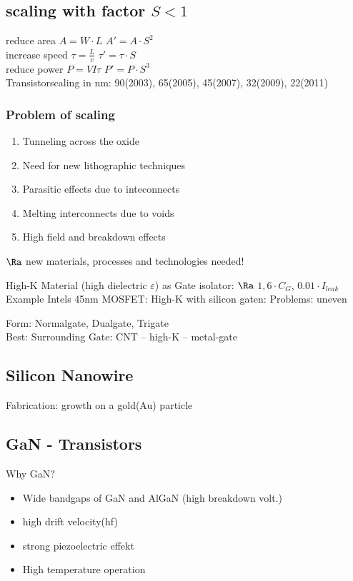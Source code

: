 \documentclass[fs, footer]{latex4ei}
\begin{document}
\begin{multicols}{4}
	
	\subsection{scaling with factor $S < 1$}
	
	reduce area $A = W \cdot L$ \quad $A' = A \cdot S^2$\\
	increase speed $\tau = \frac{L}{v}$ \quad $\tau' = \tau \cdot S$\\
	reduce power $P = VI\tau$ \quad $P' = P \cdot S^3$\\
	
	
	Transistorscaling in nm: 90(2003), 65(2005), 45(2007), 32(2009), 22(2011) 
	
		
		\subsubsection{Problem of scaling}
		\begin{enumerate}
			\item Tunneling across the oxide
			\item Need for new lithographic techniques
			\item Parasitic effects due to inteconnects
			\item Melting interconnects due to voids
			\item High field and breakdown effects
		\end{enumerate}
		$\Ra$ new materials, processes and technologies needed!

		High-K Material (high dielectric $\varepsilon$) as Gate isolator:
		$\Ra$ $1,6 \cdot C_G$, $0.01 \cdot I_{leak}$\\
		
		Example Intels 45nm MOSFET:
		High-K with silicon gaten:
		Problems: uneven 


	Form: Normalgate, Dualgate, Trigate\\
	Best: Surrounding Gate: CNT -- high-K -- metal-gate\\

	
	\subsection{Silicon Nanowire}
		Fabrication: growth on a gold(Au) particle
	
	
	\subsection{GaN - Transistors}
	Why GaN?
	\begin{itemize}
		\item Wide bandgaps of GaN and AlGaN (high breakdown volt.)	
		\item high drift velocity(hf)
		\item strong piezoelectric effekt
		\item High temperature operation
	\end{itemize}


\end{multicols}
\end{document}
